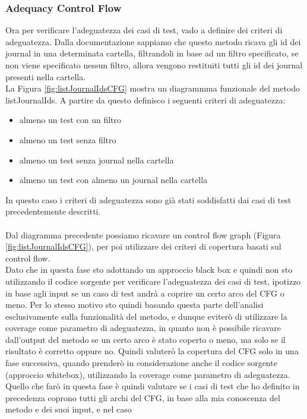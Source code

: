 \documentclass[10pt, a4paper]{article}
\begin{document}
\subsubsection{Adequacy Control Flow}
Ora per verificare l'adeguatezza dei casi di test, vado a definire dei criteri di adeguatezza. 
Dalla documentazione sappiamo che questo metodo ricava gli id dei journal in una 
determinata cartella, filtrandoli in base ad un filtro specificato, se non viene specificato 
nessun filtro, allora vengono restituiti tutti gli id dei journal presenti nella cartella. \\
La Figura \ref{fig:listJournalIdsCFG} mostra un diagrammma 
funzionale del metodo listJournalIds.
A partire da questo definisco i seguenti criteri di adeguatezza:
\begin{itemize}
  \item almeno un test con un filtro
  \item almeno un test senza filtro
  \item almeno un test senza journal nella cartella
  \item almeno un test con almeno un journal nella cartella
\end{itemize}
In questo caso i criteri di adeguatezza sono già stati soddisfatti 
dai casi di test precedentemente descritti. \\ \\
Dal diagramma precedente possiamo 
ricavare un control flow graph (Figura \ref{fig:listJournalIdsCFG}), per poi
utilizzare dei criteri di copertura basati sul control flow. \\
Dato che in questa fase sto adottando un approccio black box e quindi non sto utilizzando il codice sorgente
per verificare l'adeguatezza dei casi di test, ipotizzo in base agli input se un caso di test andrà a coprire
un certo arco del CFG o meno. Per lo stesso motivo sto quindi basando questa parte dell'analisi esclusivamente sulla funzionalità del metodo, 
e dunque eviterò di utilizzare la coverage come parametro di adeguatezza, in quanto non è possibile ricavare
dall'output del metodo se un certo arco è stato coperto o meno, ma solo se il risultato è corretto oppure no.
Quindi valuterò la copertura del CFG solo in una fase successiva, quando prenderò in considerazione
anche il codice sorgente (approccio whitebox), utilizzando la coverage come parametro di adeguatezza.
Quello che farò in questa fase è quindi valutare se i casi di test che ho definito in precedenza
coprono tutti gli archi del CFG, in base alla mia conoscenza del metodo e dei suoi input, e nel caso
\end{document}
